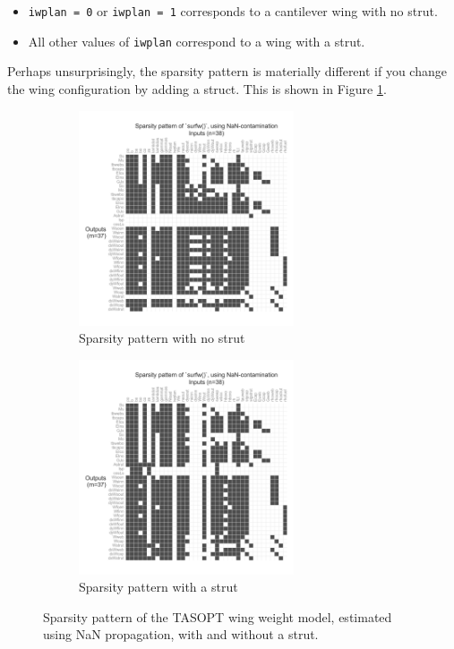 \begin{itemize}[noitemsep]
    \item \texttt{iwplan = 0} or \texttt{iwplan = 1} corresponds to a cantilever wing with no strut.
    \item All other values of \texttt{iwplan} correspond to a wing with a strut.
\end{itemize}

Perhaps unsurprisingly, the sparsity pattern is materially different if you change the wing configuration by adding a struct. This is shown in Figure \ref{fig:nan-jacobian-branching}.

\begin{figure}[H]
    \centering
    \begin{subfigure}{0.45\textwidth}
        \centering
        \includegraphics[width=2.5in]{../figures/nan-propagation/image4.png}
        \caption{Sparsity pattern with no strut}
    \end{subfigure}
    \begin{subfigure}{0.45\textwidth}
        \centering
        \includegraphics[width=2.5in]{../figures/nan-propagation/image5.png}
        \caption{Sparsity pattern with a strut}
    \end{subfigure}
    \caption{Sparsity pattern of the TASOPT wing weight model, estimated using NaN propagation, with and without a strut.}
    \label{fig:nan-jacobian-branching}
\end{figure}

